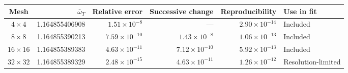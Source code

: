 \begin{tabularx}{\textwidth}{@{}c r r r r l@{}}
\toprule
Mesh & $\bar{\omega}_T$ & Relative error & Successive change & Reproducibility & Use in fit \\
\midrule
$4\times4$ & 1.164855406908 & $1.51\times10^{-8}$ & --- & $2.90\times10^{-14}$ & Included \\
$8\times8$ & 1.164855390213 & $7.59\times10^{-10}$ & $1.43\times10^{-8}$ & $1.06\times10^{-13}$ & Included \\
$16\times16$ & 1.164855389383 & $4.63\times10^{-11}$ & $7.12\times10^{-10}$ & $5.92\times10^{-13}$ & Included \\
$32\times32$ & 1.164855389329 & $2.48\times10^{-15}$ & $4.63\times10^{-11}$ & $1.26\times10^{-12}$ & Resolution-limited \\
\bottomrule
\end{tabularx}
